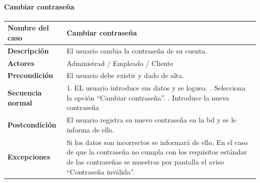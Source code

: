 \paragraph{Cambiar contraseña}
\begin{table}[H]
    \centering
    \small
    \begin{tabularx}{0.8\textwidth}{|p{3.5cm}|X|}
        \hline
        \rowcolor{lightgray}
        \textbf{Nombre del caso}  & \textbf{Cambiar contraseña}                                                                                                                                                                            \\
        \hline
        \textbf{Descripción}      & El usuario cambia la contraseña de su cuenta.                                                                                                                                                          \\
        \hline
        \textbf{Actores}          & Administrad / Empleado / Cliente                                                                                                                                                                       \\
        \hline
        \textbf{Precondición}     & El usuario debe existir y dado de alta.                                                                                                                                                                \\
        \hline
        \textbf{Secuencia normal} & 1. EL usuario introduce sus datos y se loguea. \newline
        2. Selecciona la opción ``Cambiar contraseña''. \newline
        3. Introduce la nueva contraseña                                                                                                                                                                                                   \\
        \hline
        \textbf{Postcondición}    & El usuario registra su nuevo contraseña en la \gls{bd} y se le informa de ello.                                                                                                                        \\
        \hline
        \textbf{Excepciones}      & Si los datos son incorrectos se informará de ello. En el caso de que la contraseña no cumpla con los requisitos estándar de las contraseñas se muestras por pantalla el aviso ``Contraseña inválida''. \\
        \hline
    \end{tabularx}
\end{table}
